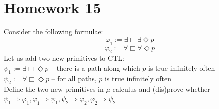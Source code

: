 \section{Homework 15}

Consider the following formulae:
$$\varphi_1 := \exists \Box \exists \Diamond p$$
$$\varphi_2 := \forall \Box \forall \Diamond p$$
Let us add two new primitives to CTL:\\
$\psi_1 := \exists \Box \Diamond p$ – there is a path along which $p$ is true infinitely often\\
$\psi_2 := \forall \Box \Diamond p$ – for all paths, $p$ is true infinitely often\\
Define the two new primitives in $\mu$-calculus and (dis)prove whether $\psi_1 \Rightarrow \varphi_1, \varphi_1 \Rightarrow \psi_1, \psi_2 \Rightarrow \varphi_2, \varphi_2 \Rightarrow \psi_2$


